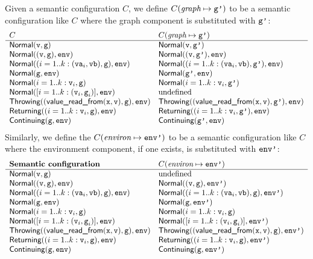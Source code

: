 \hypertarget{def-withgraph}{}
Given a semantic configuration $C$, we define $\withgraph{C}{\vgp}$ to be a semantic configuration
like $C$ where the graph component is substituted with $\vgp$:
\[
\begin{array}{ll}
  C & \withgraph{C}{\vgp}\\
  \hline
  \Normal(\vv,\vg) & \Normal(\vv,\vgp)\\
  \Normal((\vv,\vg), \env) & \Normal((\vv,\vgp), \env)\\
  \Normal((i=1..k: (\texttt{va}_i,\texttt{vb}),\vg), \env) & \Normal((i=1..k: (\texttt{va}_i,\texttt{vb}),\vgp), \env)\\
  \Normal(\vg, \env) & \Normal(\vgp, \env)\\
  \Normal(i=1..k: \vv_i, \vg) & \Normal(i=1..k: \vv_i, \vgp)\\
  \Normal([i=1..k: (\vv_i,\vg_i)], \env) & \text{undefined}\\
  \Throwing((\valuereadfrom(\vx,\vv),\vg), \env) & \Throwing((\valuereadfrom(\vx,\vv),\vgp), \env)\\
  \Returning((i=1..k: \vv_i,\vg), \env) & \Returning((i=1..k: \vv_i,\vgp), \env)\\
  \Continuing(\vg, \env) & \Continuing(\vgp, \env)\\
\end{array}
\]
\hypertarget{def-withenviron}{}
Similarly, we define the $\withenviron{C}{\envp}$ to be a semantic configuration
like $C$ where the environment component, if one exists, is substituted with $\envp$:
\[
\begin{array}{ll}
  \textbf{Semantic configuration} & \withenviron{C}{\envp}\\
  \hline
  \Normal(\vv,\vg) & \text{undefined}\\
  \Normal((\vv,\vg), \env) & \Normal((\vv,\vg), \envp)\\
  \Normal((i=1..k: (\texttt{va}_i,\texttt{vb}),\vg), \env) & \Normal((i=1..k: (\texttt{va}_i,\texttt{vb}),\vg), \envp)\\
  \Normal(\vg, \env) & \Normal(\vg, \envp)\\
  \Normal(i=1..k: \vv_i, \vg) & \Normal(i=1..k: \vv_i, \vg)\\
  \Normal([i=1..k: (\vv_i,\vg_i)], \env) & \Normal([i=1..k: (\vv_i,\vg_i)], \envp)\\
  \Throwing((\valuereadfrom(\vx,\vv),\vg), \env) & \Throwing((\valuereadfrom(\vx,\vv),\vg), \envp)\\
  \Returning((i=1..k: \vv_i,\vg), \env) & \Returning((i=1..k: \vv_i,\vg), \envp)\\
  \Continuing(\vg, \env) & \Continuing(\vg, \envp)\\
\end{array}
\]

